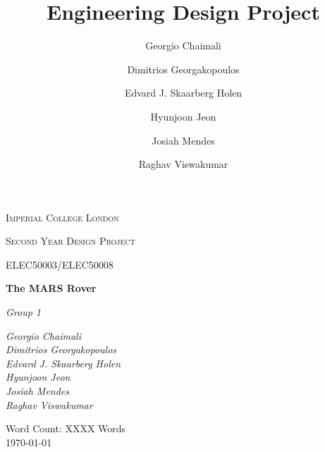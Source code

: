 \documentclass[a4paper]{article}
\title{Engineering Design Project}
\author{Georgio Chaimali \and 
        Dimitrios Georgakopoulos \and 
        Edvard J. Skaarberg Holen \and 
        Hyunjoon Jeon \and 
        Josiah Mendes \and 
        Raghav Viswakumar}
\begin{document}
 
\begin{titlepage}
    \setlength{\headheight}{66.89pt}
    \thispagestyle{fancy}
    \renewcommand{\headrulewidth}{0pt}
    \renewcommand{\footrulewidth}{0pt}
    \cfoot{} %
    \hbox{}\vfill
    \begin{center} 
	    {\scshape\LARGE Imperial College London  \par}
	    \vspace{1cm}
        {\scshape\Large Second Year Design Project\par}
        \vspace{0.25cm}
        {\scshape\Large ELEC50003/ELEC50008\par}
        \vspace{1.5cm}
        {\huge\bfseries The MARS Rover\par}
        \vspace{2cm}
        {\Large\itshape Group 1\par}
        \vfill
        \begin{flushright}
            \textsl{ \large
            Georgio Chaimali \\ 
            Dimitrios Georgakopoulos \\ 
            Edvard J. Skaarberg Holen \\ 
            Hyunjoon Jeon \\ 
            Josiah Mendes \\ 
            Raghav Viswakumar
            }
        \end{flushright}
        \vfill

        {\large Word Count: XXXX Words \\ \today\par}
    \end{center}
\end{titlepage}
 
\setcounter{tocdepth}{2}
\tableofcontents
\end{document}
